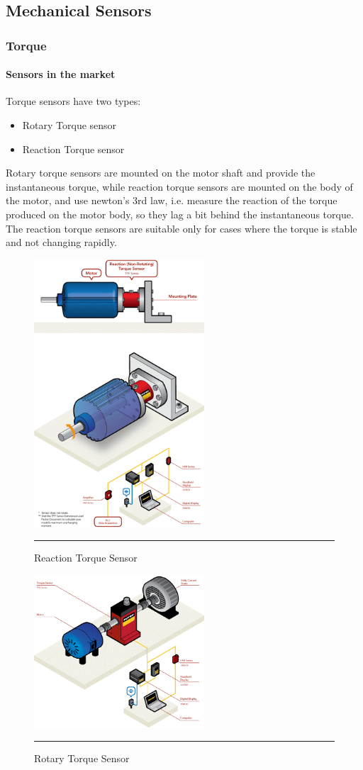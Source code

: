 \subsection{Mechanical Sensors}
\subsubsection{Torque}
\paragraph{Sensors in the market}
Torque sensors have two types:
\begin{itemize}
 \item Rotary Torque sensor
 \item Reaction Torque sensor
\end{itemize}
Rotary torque sensors are mounted on the motor shaft and provide the instantaneous torque, while reaction torque sensors are mounted on the body of the motor, and use newton’s 3rd law, i.e. measure the reaction of the torque produced on the motor body, so they lag a bit behind the instantaneous torque. The reaction torque sensors are suitable only for cases where the torque is stable and not changing rapidly.
\begin{figure}[htbp]
	\centering
		\includegraphics[width = 2.5in]{./Figures/MS/fig313.png}
		\rule{35em}{0.5pt}
	\caption{Reaction Torque Sensor}
	\label{fig:Reaction Torque Sensor} 
\end{figure}
\begin{figure}[htbp]
	\centering
		\includegraphics[width = 2.5in]{./Figures/MS/fig314.png}
		\rule{35em}{0.5pt}
	\caption{Rotary Torque Sensor}
	\label{fig:Rotary Torque Sensor} 
\end{figure}

